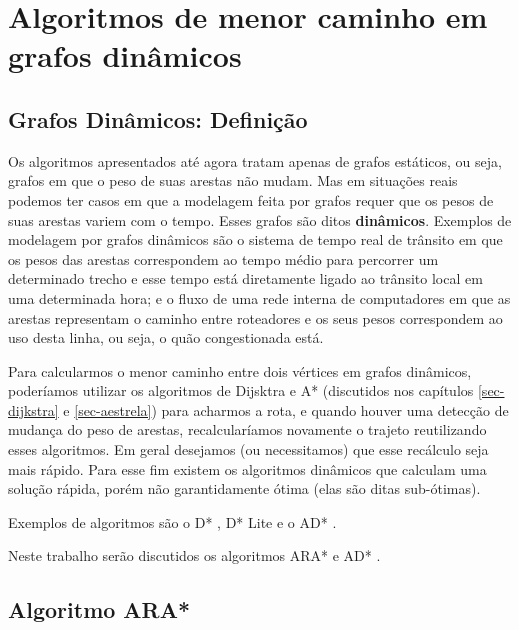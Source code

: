 \chapter{Algoritmos de menor caminho em grafos dinâmicos}
\label{sec-dinamicos}

\section{Grafos Dinâmicos: Definição}
\label{sec-dinamicos-grafos}
Os algoritmos apresentados até agora tratam apenas de grafos estáticos, ou seja, grafos em que o peso de suas arestas não mudam. Mas em situações reais podemos ter casos em que a modelagem feita por grafos requer que os pesos de suas arestas variem com o tempo. Esses grafos são ditos \textbf{dinâmicos}. Exemplos de modelagem por grafos dinâmicos são o sistema de tempo real de trânsito em que os pesos das arestas correspondem ao tempo médio para percorrer um determinado trecho e esse tempo está diretamente ligado ao trânsito local em uma determinada hora; e o fluxo de uma rede interna de computadores em que as arestas representam o caminho entre roteadores e os seus pesos correspondem ao uso desta linha, ou seja, o quão congestionada está.

Para calcularmos o menor caminho entre dois vértices em grafos dinâmicos, poderíamos utilizar os algoritmos de Dijsktra e A* (discutidos nos capítulos \ref{sec-dijkstra} e \ref{sec-aestrela})  para acharmos a rota, e quando houver uma detecção de mudança do peso de arestas, recalcularíamos novamente o trajeto reutilizando esses algoritmos. Em geral desejamos (ou necessitamos) que esse recálculo seja mais rápido. Para esse fim existem os algoritmos dinâmicos que calculam uma solução rápida, porém não garantidamente ótima (elas são ditas sub-ótimas).

Exemplos de algoritmos são o D* \cite{stentz1994optimal}, D* Lite \cite{koenig2002d} e o AD* \cite{likhachev2008anytime}.

Neste trabalho serão discutidos os algoritmos ARA* e AD* \cite{likhachev2008anytime}.
\section{Algoritmo ARA*}
\label{sec-dinamicos-ara}

